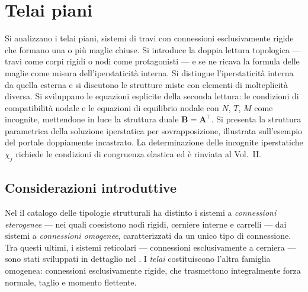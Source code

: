 \graphicspath{{Parti/P04-Travi_rigide/C06-Telai_piani/Figure/}}
\chapter{Telai piani}
\label{cap:telai_piani}

\begin{sommario}
	Si analizzano i telai piani, sistemi di travi con
	connessioni esclusivamente rigide che formano una
	o più maglie chiuse. Si introduce la doppia lettura
	topologica --- travi come corpi rigidi o nodi come
	protagonisti --- e se ne ricava la formula delle
	maglie come misura dell'iperstaticità interna.
	Si distingue l'iperstaticità interna da quella
	esterna e si discutono le strutture miste con
	elementi di molteplicità diversa.
	Si sviluppano le equazioni esplicite della seconda
	lettura: le condizioni di compatibilità nodale e
	le equazioni di equilibrio nodale con $N$, $T$, $M$
	come incognite, mettendone in luce la struttura
	duale $\bm{B} = \bm{A}^\top$.
	Si presenta la struttura parametrica della soluzione
	iperstatica per sovrapposizione, illustrata
	sull'esempio del portale doppiamente incastrato.
	La determinazione delle incognite iperstatiche
	$\chi_j$ richiede le condizioni di congruenza
	elastica ed è rinviata al Vol.~II.
\end{sommario}




\section*{Considerazioni introduttive}
\label{sec:raccordo_telai}

Nel  il catalogo delle
tipologie strutturali ha distinto i sistemi a
\emph{connessioni eterogenee} --- nei quali coesistono
nodi rigidi, cerniere interne e carrelli --- dai sistemi
a \emph{connessioni omogenee}, caratterizzati da un unico
tipo di connessione. Tra questi ultimi, i sistemi
reticolari --- connessioni esclusivamente a cerniera ---
sono stati sviluppati in dettaglio nel
. I \emph{telai} costituiscono
l'altra famiglia omogenea: connessioni esclusivamente
rigide, che trasmettono integralmente forza normale,
taglio e momento flettente.

